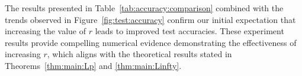 \documentclass[nohyperref]{article}
\theoremstyle{plain}
\theoremstyle{definition}
\theoremstyle{remark}
\begin{document}
The results presented in Table~\ref{tab:accuracy:comparison} combined with the trends observed in Figure~\ref{fig:test:accuracy} confirm our initial expectation that increasing the value of $r$ leads to improved test accuracies. 
These experiment results provide compelling numerical evidence demonstrating the effectiveness of increasing $r$, which aligns with the theoretical results stated in Theorems~\ref{thm:main:Lp} and \ref{thm:main:Linfty}.
\end{document}
